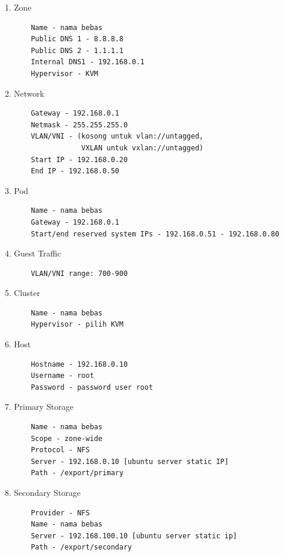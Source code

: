 \begin{enumerate}
    \item Zone
    \begin{verbatim}
    Name - nama bebas
    Public DNS 1 - 8.8.8.8
    Public DNS 2 - 1.1.1.1
    Internal DNS1 - 192.168.0.1
    Hypervisor - KVM
    \end{verbatim}

    \item Network
    \begin{verbatim}
    Gateway - 192.168.0.1
    Netmask - 255.255.255.0
    VLAN/VNI - (kosong untuk vlan://untagged, 
                VXLAN untuk vxlan://untagged)
    Start IP - 192.168.0.20
    End IP - 192.168.0.50
    \end{verbatim}

    \item Pod
    \begin{verbatim}
    Name - nama bebas
    Gateway - 192.168.0.1
    Start/end reserved system IPs - 192.168.0.51 - 192.168.0.80
    \end{verbatim}

    \item Guest Traffic
    \begin{verbatim}
    VLAN/VNI range: 700-900
    \end{verbatim}

    \item Cluster
    \begin{verbatim}
    Name - nama bebas
    Hypervisor - pilih KVM
    \end{verbatim}

    \item Host
    \begin{verbatim}
    Hostname - 192.168.0.10
    Username - root
    Password - password user root
    \end{verbatim}

    \item Primary Storage
    \begin{verbatim}
    Name - nama bebas
    Scope - zone-wide
    Protocol - NFS
    Server - 192.168.0.10 [ubuntu server static IP]
    Path - /export/primary
    \end{verbatim}
    
    \item Secondary Storage
    \begin{verbatim}
    Provider - NFS
    Name - nama bebas
    Server - 192.168.100.10 [ubuntu server static ip]
    Path - /export/secondary
    \end{verbatim}
\end{enumerate}

